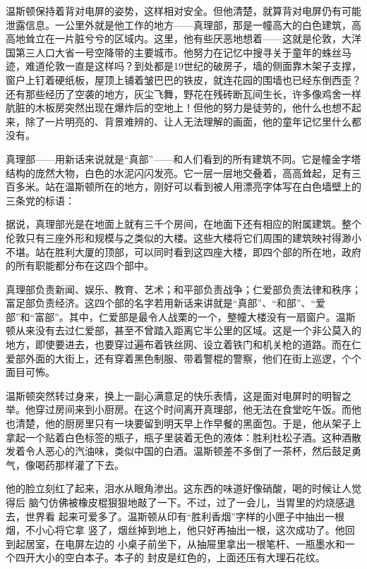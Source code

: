 温斯顿保持着背对电屏的姿势，这样相对安全。但他清楚，就算背对电屏仍有可能泄露信息。一公里外就是他工作的地方——真理部，那是一幢高大的白色建筑，高高地耸立在一片脏兮兮的区域内。这里，他有些厌恶地想着——这就是伦敦，大洋国第三人口大省一号空降带的主要城市。他努力在记忆中搜寻关于童年的蛛丝马迹，难道伦敦一直是这样吗？到处都是19世纪的破房子，墙的侧面靠木架子支撑，窗户上钉着硬纸板，屋顶上铺着皱巴巴的铁皮，就连花园的围墙也已经东倒西歪？还有那些经历了空袭的地方，灰尘飞舞，野花在残砖断瓦间生长，许多像鸡舍一样肮脏的木板房突然出现在爆炸后的空地上！但他的努力是徒劳的，他什么也想不起来，除了一片明亮的、背景难辨的、让人无法理解的画面，他的童年记忆里什么都没有。

真理部——用新话来说就是``真部''——和人们看到的所有建筑不同。它是幢金字塔结构的庞然大物，白色的水泥闪闪发亮。它一层一层地交叠着，高高耸起，足有三百多米。站在温斯顿所在的地方，刚好可以看到被人用漂亮字体写在白色墙壁上的三条党的标语：


据说，真理部光是在地面上就有三千个房间，在地面下还有相应的附属建筑。整个伦敦只有三座外形和规模与之类似的大楼。这些大楼将它们周围的建筑映衬得渺小不堪。站在胜利大厦的顶部，可以同时看到这四座大楼，即四个部的所在地，政府的所有职能都分布在这四个部中。

真理部负责新闻、娱乐、教育、艺术；和平部负责战争；仁爱部负责法律和秩序；富足部负责经济。这四个部的名字若用新话来讲就是``真部''、``和部''、``爱部''和``富部''。其中，仁爱部是最令人战栗的一个，整幢大楼没有一扇窗户。温斯顿从来没有去过仁爱部，甚至不曾踏入距离它半公里的区域。这是一个非公莫入的地方，即使要进去，也要穿过遍布着铁丝网、设立着铁门和机关枪的道路。而在仁爱部外面的大街上，还有穿着黑色制服、带着警棍的警察，他们在街上巡逻，个个面目可怖。

温斯顿突然转过身来，换上一副心满意足的快乐表情，这是面对电屏时的明智之举。他穿过房间来到小厨房。在这个时间离开真理部，他无法在食堂吃午饭。而他也清楚，他的厨房里只有一块要留到明天早上作早餐的黑面包。于是，他从架子上拿起一个贴着白色标签的瓶子，瓶子里装着无色的液体：胜利杜松子酒。这种酒散发着令人恶心的汽油味，类似中国的白酒。温斯顿差不多倒了一茶杯，然后鼓足勇气，像喝药那样灌了下去。


他的脸立刻红了起来，泪水从眼角渗出。这东西的味道好像硝酸，喝的时候让人觉得后
脑勺仿佛被橡皮棍狠狠地敲了一下。不过，过了一会儿，当胃里的灼烧感退去，世界看
起来可爱多了。温斯顿从印有``胜利香烟''字样的小匣子中抽出一根烟，不小心将它拿
竖了，烟丝掉到地上，他只好再抽出一根，这次成功了。他回到起居室，在电屏左边的
小桌子前坐下，从抽屉里拿出一根笔杆、一瓶墨水和一个四开大小的空白本子。本子的
封皮是红色的，上面还压有大理石花纹。

